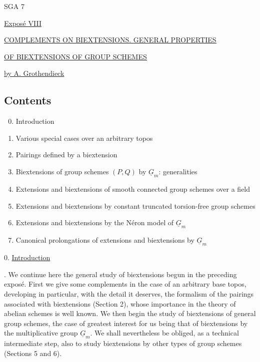 
\begin{center}
SGA 7

\vspace{1em}
\underline{Expos\'e VIII}

\vspace{1em}
\underline{\underline{COMPLEMENTS ON BIEXTENSIONS. GENERAL PROPERTIES}}

\underline{\underline{OF BIEXTENSIONS OF GROUP SCHEMES}}

\vspace{1em}
\underline{by A. Grothendieck}
\end{center}

\subsection*{Contents}

\begin{enumerate}[label=\arabic*.]
\setcounter{enumi}{-1}
\item Introduction
\item Various special cases over an arbitrary topos
\item Pairings defined by a biextension
\item Biextensions of group schemes $(P,Q)$ by $\underline G_m$: generalities
\item Extensions and biextensions of smooth connected group schemes over a field
\item Extensions and biextensions by constant truncated torsion-free group schemes
\item Extensions and biextensions by the N\'eron model of $\underline G_m$
\item Canonical prolongations of extensions and biextensions by $\underline G_m$
\end{enumerate}

0. \underline{Introduction}

. We continue here the general study of biextensions begun in the
preceding expos\'e.  First we give some complements in the case of an
arbitrary base topos, developing in particular, with the detail it
deserves, the formalism of the pairings associated with biextensions
(Section 2), whose importance in the theory of abelian schemes is well
known.  We then begin the study of biextensions of general group
schemes, the case of greatest interest for us being that of
biextensions by the multiplicative group $\underline G_m$.  We shall
nevertheless be obliged, as a technical intermediate step, also to
study biextensions by other types of group schemes (Sections 5 and 6).

